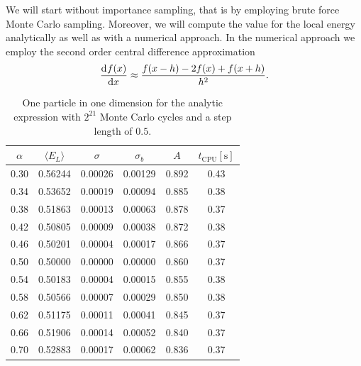\documentclass[
    a4paper, aps, twocolumn, floatfix, superscriptaddress,
    nofootinbib]{revtex4-1}
\newcommand{\1}{\mathds{1}}
\begin{document}
        We will start without importance sampling, that is by employing brute
        force Monte Carlo sampling. Moreover, we will compute the value for the
        local energy analytically as well as with a numerical approach.  In the
        numerical approach we employ the second order central difference
        approximation
        \begin{equation}
            \dod[]{f(x)}{x} \approx \frac{f(x-h) - 2f(x) + f(x+h)}{h^2}.
        \end{equation}

        \begin{table}
            \centering
            \caption{One particle in one dimension for the analytic expression
            with $2^{21}$ Monte Carlo cycles and a step length of $0.5$.}
            \begin{ruledtabular}
                \begin{tabular}{cccccc}
                    $\alpha$ & $\langle  E_L\rangle$ & $\sigma$ & $\sigma_b$
                    & $A$ & $t_{\text{CPU}} [\si{\second}]$ \\
                    \hline
                    0.30&0.56244&0.00026&0.00129&0.892&0.43\\
                    0.34&0.53652&0.00019&0.00094&0.885&0.38\\
                    0.38&0.51863&0.00013&0.00063&0.878&0.37\\
                    0.42&0.50805&0.00009&0.00038&0.872&0.38\\
                    0.46&0.50201&0.00004&0.00017&0.866&0.37\\
                    0.50&0.50000&0.00000&0.00000&0.860&0.37\\
                    0.54&0.50183&0.00004&0.00015&0.855&0.38\\
                    0.58&0.50566&0.00007&0.00029&0.850&0.38\\
                    0.62&0.51175&0.00011&0.00041&0.845&0.37\\
                    0.66&0.51906&0.00014&0.00052&0.840&0.37\\
                    0.70&0.52883&0.00017&0.00062&0.836&0.37\\
                \end{tabular}
            \end{ruledtabular}
            \label{tab:1D1N_analytic}
        \end{table}
\end{document}
